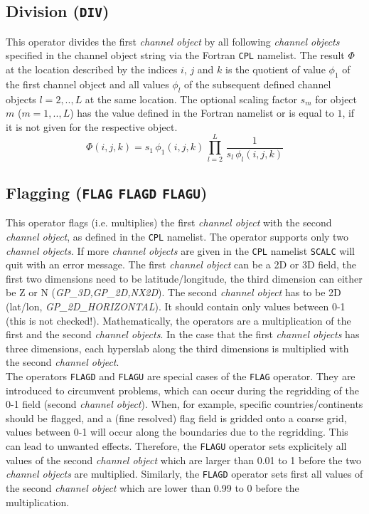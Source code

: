 \documentclass[twoside]{article}
\begin{document}
\subsection{Division ({\tt DIV})}
\label{sec:division}
This operator divides the first {\it channel object} by all following {\it channel objects} specified in the channel object string via the Fortran {\tt CPL} namelist.
The result $\Phi$ at the location described by the indices $i$, $j$ and $k$ is the quotient of value $\phi_1$ of the first channel object and all values $\phi_l$ of the subsequent defined channel objects $l=2,..,L$ at the same location.
The optional scaling factor $s_m$ for object $m$ ($m=1,..,L$) has the value defined in the Fortran namelist or is equal to $1$, if it is not given for the respective object.
%
\begin{equation}
   \Phi(i,j,k) = s_1\,\phi_1(i,j,k)\,\prod_{l=2}^L\,\frac{1}{s_l\,\phi_l(i,j,k)}
\end{equation}
%

\subsection{Flagging ({\tt FLAG} {\tt FLAGD} {\tt FLAGU})}
\label{sec:flagging}
This operator flags (i.e. multiplies) the first {\it channel object} with the second {\it channel object}, as defined in the {\tt CPL} namelist. The operator supports only two {\it channel objects}. If more {\it channel objects} are given in the {\tt CPL} namelist {\tt SCALC} will quit with an error message.
The first {\it channel object} can be a 2D or 3D field, the first two dimensions need to be latitude/longitude, the third dimension can  either be Z or N ({\it GP\_3D,GP\_2D,NX2D}).  The second {\it channel object} has to be 2D (lat/lon, {\it GP\_2D\_HORIZONTAL}). It should contain only values between 0-1 (this is not checked!).
Mathematically, the operators are a multiplication of the first and the second
{\it channel objects}. In the case that the first {\it channel objects} has
three dimensions, each hyperslab along the third dimensions is multiplied with the second {\it channel object}.  \\

The operators {\tt FLAGD} and {\tt FLAGU} are special cases of the {\tt FLAG} operator. They are introduced to circumvent problems, which can occur during the regridding of the 0-1 field (second {\it channel object}). When, for example, specific countries/continents should be flagged, and a (fine resolved) flag field is gridded onto a coarse grid, values between 0-1 will occur along the boundaries due to the regridding. This can lead to unwanted effects.
Therefore, the {\tt FLAGU} operator sets explicitely all values of the second {\it channel object} which are larger than 0.01 to 1 before the two {\it channel objects} are multiplied.
Similarly, the {\tt FLAGD} operator sets first all values of the second {\it channel object} which are lower than 0.99 to 0 before the multiplication.  \\
\end{document}
